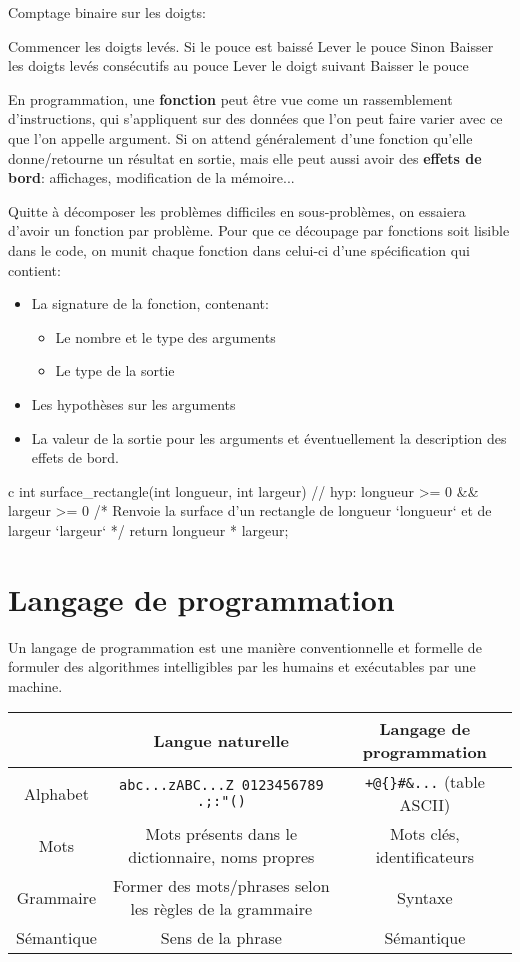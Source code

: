 \documentclass{scrartcl}
\begin{document}
		\exemple Comptage binaire sur les doigts:
		\begin{algotext}
Commencer les doigts levés.
Si le pouce est baissé
	Lever le pouce
Sinon
	Baisser les doigts levés consécutifs au pouce
	Lever le doigt suivant
	Baisser le pouce
		\end{algotext}

		En programmation, une \textbf{fonction} peut être vue come un rassemblement d'instructions, 
		qui s'appliquent sur des données que l'on peut faire varier avec ce que l'on appelle argument.
		Si on attend généralement d'une fonction qu'elle donne/retourne un résultat en sortie, 
		mais elle peut aussi avoir des \textbf{effets de bord}: affichages, modification de la mémoire...

		\rem Quitte à décomposer les problèmes difficiles en sous-problèmes, on essaiera d'avoir un fonction par problème.
		Pour que ce découpage par fonctions soit lisible dans le code, 
		on munit chaque fonction dans celui-ci d'une spécification qui contient:
		\begin{itemize}
			\item La signature de la fonction, contenant:
			\begin{itemize}
				\item Le nombre et le type des arguments
				\item Le type de la sortie
			\end{itemize}
			\item Les hypothèses sur les arguments
			\item La valeur de la sortie pour les arguments et éventuellement la description des effets de bord.
		\end{itemize}

		\exemple
		\begin{code}{c}
			int surface_rectangle(int longueur, int largeur)
			{
				// hyp: longueur >= 0 && largeur >= 0
				/* Renvoie la surface d'un rectangle de longueur `longueur` et de largeur `largeur` */
				return longueur * largeur;
			}
		\end{code}
	\section{Langage de programmation}
		 Un langage de programmation est une manière conventionnelle et formelle
		de formuler des algorithmes intelligibles par les humains et exécutables par une machine.

		\begin{tabular}{| c | c | c |}
			\hline
			 & Langue naturelle & Langage de programmation \\
			 \hline
			 Alphabet & \Verb|abc...zABC...Z 0123456789 .;:"()| & \Verb|+@{}#&...| (table ASCII) \\
			 \hline 
			 Mots & Mots présents dans le dictionnaire, noms propres & Mots clés, identificateurs \\
			 \hline
			 Grammaire & Former des mots/phrases selon les règles de la grammaire & Syntaxe \\
			 \hline
			 Sémantique & Sens de la phrase & Sémantique \\
			 \hline
		\end{tabular}
	
			
\end{document}
